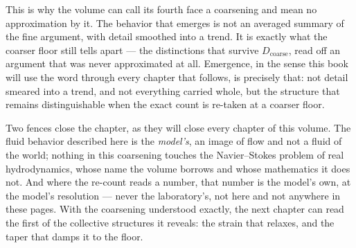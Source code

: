 This is why the volume can call its fourth face a coarsening and mean no
approximation by it. The behavior that emerges is not an averaged summary of the
fine argument, with detail smoothed into a trend. It is exactly what the coarser
floor still tells apart --- the distinctions that survive $D_{\text{coarse}}$,
read off an argument that was never approximated at all. Emergence, in the sense
this book will use the word through every chapter that follows, is precisely
that: not detail smeared into a trend, and not everything carried whole, but the
structure that remains distinguishable when the exact count is re-taken at a
coarser floor.

Two fences close the chapter, as they will close every chapter of this volume.
The fluid behavior described here is the \emph{model's}, an image of flow and not
a fluid of the world; nothing in this coarsening touches the Navier--Stokes
problem of real hydrodynamics, whose name the volume borrows and whose
mathematics it does not. And where the re-count reads a number, that number is the
model's own, at the model's resolution --- never the laboratory's, not here and
not anywhere in these pages. With the coarsening understood exactly, the next
chapter can read the first of the collective structures it reveals: the strain
that relaxes, and the taper that damps it to the floor.
